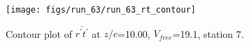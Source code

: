 \begin{figure}[H]
\centering
\texttt{[image: figs/run\_63/run\_63\_rt\_contour]}
\caption{Contour plot of $\overline{r^\prime t^\prime}$ at $z/c$=10.00, $V_{free}$=19.1, station 7.}
\end{figure}


